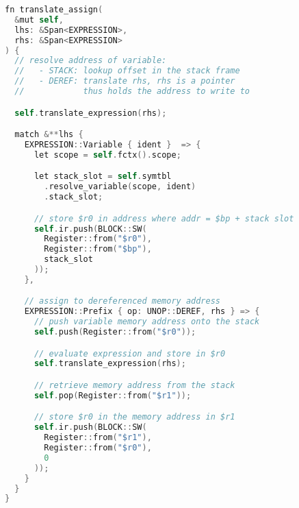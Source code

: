 \begin{lstlisting}[language=C]
fn translate_assign(
  &mut self, 
  lhs: &Span<EXPRESSION>, 
  rhs: &Span<EXPRESSION>
) {
  // resolve address of variable:
  //   - STACK: lookup offset in the stack frame
  //   - DEREF: translate rhs, rhs is a pointer 
  //            thus holds the address to write to

  self.translate_expression(rhs);

  match &**lhs {
    EXPRESSION::Variable { ident }  => {
      let scope = self.fctx().scope;

      let stack_slot = self.symtbl
        .resolve_variable(scope, ident)
        .stack_slot;

      // store $r0 in address where addr = $bp + stack slot
      self.ir.push(BLOCK::SW(
        Register::from("$r0"), 
        Register::from("$bp"), 
        stack_slot
      ));
    },

    // assign to dereferenced memory address
    EXPRESSION::Prefix { op: UNOP::DEREF, rhs } => {
      // push variable memory address onto the stack 
      self.push(Register::from("$r0"));

      // evaluate expression and store in $r0
      self.translate_expression(rhs);

      // retrieve memory address from the stack
      self.pop(Register::from("$r1"));

      // store $r0 in the memory address in $r1
      self.ir.push(BLOCK::SW(
        Register::from("$r1"),
        Register::from("$r0"), 
        0
      ));
    }
  }
}
\end{lstlisting}